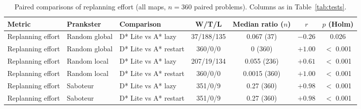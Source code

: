 \begin{table}[!t]
\centering
\footnotesize
\caption{Paired comparisons of replanning effort (all maps, $n=360$ paired problems). Columns as in Table~\ref{tab:tests}.}
\label{tab:tests-replan}
\begin{tabular}{lllcccc}
\toprule
Metric & Prankster & Comparison & W/T/L & Median ratio ($n$) & $r$ & $p$ (Holm) \\
\midrule
Replanning effort & Random global & D* Lite vs A* lazy & 37/188/135 & 0.067 (37) & $-0.26$ & 0.026 \\
Replanning effort & Random global & D* Lite vs A* restart & 360/0/0 & 0 (360) & $+1.00$ & $<$ 0.001 \\
Replanning effort & Random local & D* Lite vs A* lazy & 207/19/134 & 0.055 (236) & $+0.61$ & $<$ 0.001 \\
Replanning effort & Random local & D* Lite vs A* restart & 360/0/0 & 0.0015 (360) & $+1.00$ & $<$ 0.001 \\
Replanning effort & Saboteur & D* Lite vs A* lazy & 351/0/9 & 0.27 (360) & $+0.98$ & $<$ 0.001 \\
Replanning effort & Saboteur & D* Lite vs A* restart & 351/0/9 & 0.27 (360) & $+0.98$ & $<$ 0.001 \\
\bottomrule
\end{tabular}
\end{table}
